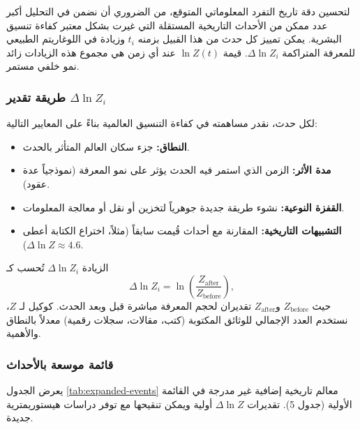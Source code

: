 \documentclass[11pt,a4paper]{article}
\begin{document}
	لتحسين دقة تاريخ التفرد المعلوماتي المتوقع، من الضروري أن نضمن في التحليل أكبر عدد ممكن من الأحداث التاريخية المستقلة التي غيرت بشكل معتبر كفاءة تنسيق البشرية. يمكن تمييز كل حدث من هذا القبيل بزمنه \(t_i\) وزيادة في اللوغاريتم الطبيعي للمعرفة المتراكمة \(\Delta \ln Z_i\). قيمة \(\ln Z(t)\) عند أي زمن هي مجموع هذه الزيادات زائد نمو خلفي مستمر.
	
	\subsubsection{طريقة تقدير \(\Delta \ln Z_i\)}
	
	لكل حدث، نقدر مساهمته في كفاءة التنسيق العالمية بناءً على المعايير التالية:
	\begin{itemize}
		\item \textbf{النطاق:} جزء سكان العالم المتأثر بالحدث.
		\item \textbf{مدة الأثر:} الزمن الذي استمر فيه الحدث يؤثر على نمو المعرفة (نموذجياً عدة عقود).
		\item \textbf{القفزة النوعية:} نشوء طريقة جديدة جوهرياً لتخزين أو نقل أو معالجة المعلومات.
		\item \textbf{التشبيهات التاريخية:} المقارنة مع أحداث قُيمت سابقاً (مثلاً، اختراع الكتابة أعطى \(\Delta \ln Z \approx 4.6\)).
	\end{itemize}
	الزيادة \(\Delta \ln Z_i\) تُحسب كـ
	\[
	\Delta \ln Z_i = \ln\left(\frac{Z_{\text{after}}}{Z_{\text{before}}}\right),
	\]
	حيث \(Z_{\text{before}}\) و\(Z_{\text{after}}\) تقديران لحجم المعرفة مباشرة قبل وبعد الحدث. كوكيل لـ \(Z\)، نستخدم العدد الإجمالي للوثائق المكتوبة (كتب، مقالات، سجلات رقمية) معدلاً بالنطاق والأهمية.
	
	\subsubsection{قائمة موسعة بالأحداث}
	
	يعرض الجدول \ref{tab:expanded-events} معالم تاريخية إضافية غير مدرجة في القائمة الأولية (جدول 5). تقديرات \(\Delta \ln Z\) أولية ويمكن تنقيحها مع توفر دراسات هيستوريمترية جديدة.
	
\end{document}

